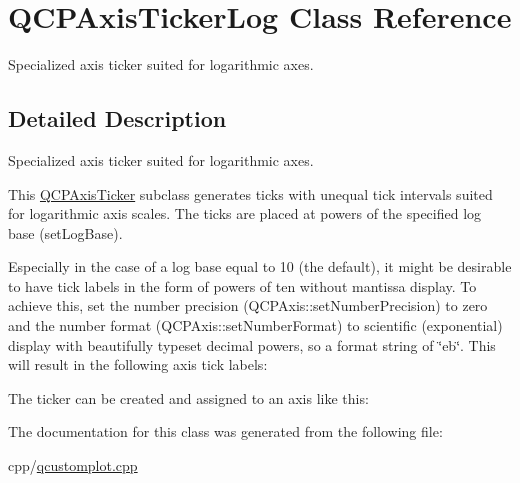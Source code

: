 \hypertarget{class_q_c_p_axis_ticker_log}{}\section{Q\+C\+P\+Axis\+Ticker\+Log Class Reference}
\label{class_q_c_p_axis_ticker_log}


Specialized axis ticker suited for logarithmic axes.  




\subsection{Detailed Description}
Specialized axis ticker suited for logarithmic axes. 



This \mbox{\hyperlink{class_q_c_p_axis_ticker}{Q\+C\+P\+Axis\+Ticker}} subclass generates ticks with unequal tick intervals suited for logarithmic axis scales. The ticks are placed at powers of the specified log base (set\+Log\+Base).

Especially in the case of a log base equal to 10 (the default), it might be desirable to have tick labels in the form of powers of ten without mantissa display. To achieve this, set the number precision (Q\+C\+P\+Axis\+::set\+Number\+Precision) to zero and the number format (Q\+C\+P\+Axis\+::set\+Number\+Format) to scientific (exponential) display with beautifully typeset decimal powers, so a format string of {\ttfamily \char`\"{}eb\char`\"{}}. This will result in the following axis tick labels\+:



The ticker can be created and assigned to an axis like this\+: 
\begin{DoxyCodeInclude}
\end{DoxyCodeInclude}


The documentation for this class was generated from the following file\+:\begin{DoxyCompactItemize}
\item 
cpp/\mbox{\hyperlink{qcustomplot_8cpp}{qcustomplot.\+cpp}}\end{DoxyCompactItemize}
